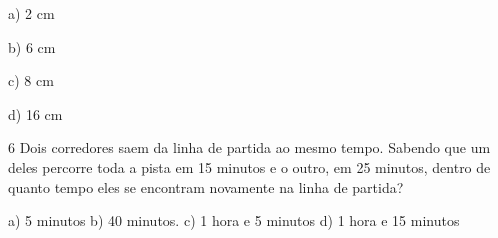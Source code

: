 a) 2 cm

b) 6 cm

c) 8 cm

d) 16 cm




\num{6} Dois corredores saem da linha de partida ao mesmo tempo. Sabendo que
um deles percorre toda a pista em 15 minutos e o outro, em 25 minutos,
dentro de quanto tempo eles se encontram novamente na linha de partida?

a) 5 minutos b) 40 minutos. c) 1 hora e 5 minutos d) 1 hora e 15 minutos



